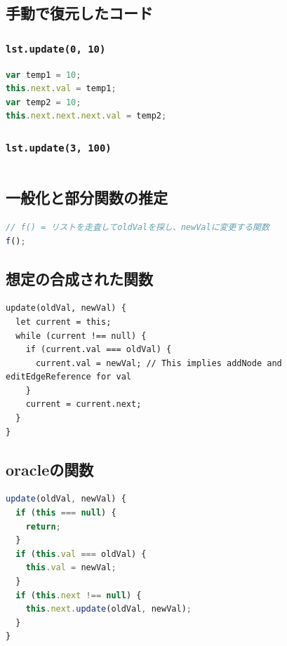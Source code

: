 \documentclass{article}
\begin{document}
\subsection{手動で復元したコード}

\subsubsection{\texttt{lst.update(0, 10)}}
\begin{lstlisting}[language=JavaScript]
var temp1 = 10;
this.next.val = temp1;
var temp2 = 10;
this.next.next.next.val = temp2;
\end{lstlisting}

\subsubsection{\texttt{lst.update(3, 100)}}
\begin{lstlisting}[language=JavaScript]

\end{lstlisting}

\subsection{一般化と部分関数の推定}

\begin{lstlisting}[language=JavaScript]
// f() = リストを走査してoldValを探し、newValに変更する関数
f();
\end{lstlisting}

\subsection{想定の合成された関数}
\begin{lstlisting}
update(oldVal, newVal) {
  let current = this;
  while (current !== null) {
    if (current.val === oldVal) {
      current.val = newVal; // This implies addNode and editEdgeReference for val
    }
    current = current.next;
  }
}
\end{lstlisting}

\subsection{oracleの関数}
\begin{lstlisting}[language=JavaScript]
update(oldVal, newVal) {
  if (this === null) {
    return;
  }
  if (this.val === oldVal) {
    this.val = newVal;
  }
  if (this.next !== null) {
    this.next.update(oldVal, newVal);
  }
}
\end{lstlisting}
\end{document}
